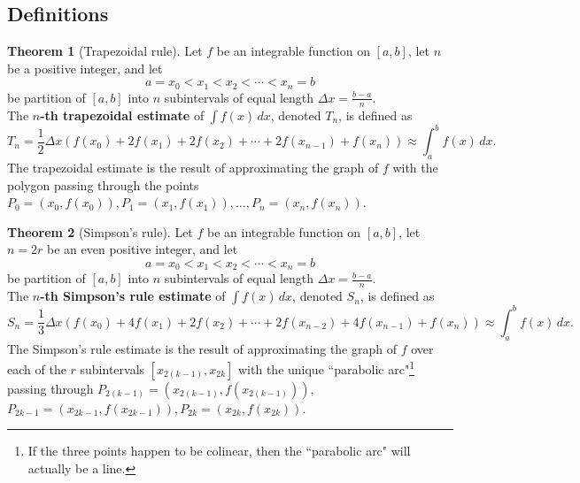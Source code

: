 \documentclass[11pt]{article}
\theoremstyle{definition}
\theoremstyle{named}
\newtheorem*{namedtheorem}{Theorem}
\numberwithin{myalgctr}{section}
\begin{document}
\thispagestyle{fancy}







\subsection*{Definitions}
\begin{namedtheorem}[Trapezoidal rule] Let $f$ be an integrable function on $[a,b]$, let $n$ be a positive integer, and let
  \[
  a=x_0< x_1< x_2<\cdots < x_n=b
  \]
  be partition of $[a,b]$ into $n$ subintervals of equal length $\Delta x=\frac{b-a}{n}$.
  \vspace{.1in}
  \\
  The {\bf $n$-th trapezoidal estimate} of $\displaystyle\int f(x)\, dx$, denoted $T_n$, is defined as
  \[
  T_n=\frac{1}{2}\Delta x(f(x_0)+2f(x_1)+2f(x_2)+\cdots +2f(x_{n-1})+f(x_n))\approx \int_a^b f(x)\, dx.
  \]
  The trapezoidal estimate is the result of approximating the graph of $f$ with the polygon passing through the points $P_0=(x_0, f(x_0)), P_1=(x_1,f(x_1)), \dots, P_n=(x_n, f(x_n))$.
\end{namedtheorem}
\begin{namedtheorem}[Simpson's rule]  Let $f$ be an integrable function on $[a,b]$, let $n=2r$ be an even positive integer, and let
  \[
  a=x_0< x_1< x_2<\cdots < x_n=b
  \]
  be partition of $[a,b]$ into $n$ subintervals of equal length $\Delta x=\frac{b-a}{n}$.
  \vspace{.1in}
  \\
  The {\bf $n$-th Simpson's rule estimate} of $\displaystyle\int f(x)\, dx$, denoted $S_n$, is defined as
  \[
  S_n=\frac{1}{3}\Delta x(f(x_0)+4f(x_1)+2f(x_2)+\cdots +2f(x_{n-2})+4f(x_{n-1})+f(x_n))\approx \int_a^b f(x)\, dx.
  \]
  The Simpson's rule estimate is the result of approximating the graph of $f$ over each of the $r$ subintervals $[x_{2(k-1)},x_{2k}]$ with the unique ``parabolic arc"\footnote{If the three points happen to be colinear, then the ``parabolic arc" will actually be a line.} passing through $P_{2(k-1)}=(x_{2(k-1)}, f(x_{2(k-1)}))$, $P_{2k-1}=(x_{2k-1}, f(x_{2k-1})), P_{2k}=(x_{2k},f(x_{2k}))$.
\end{namedtheorem}

\end{document}
